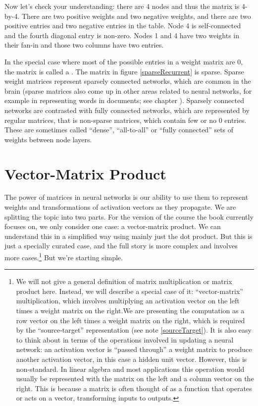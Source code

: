 \noindent Now let's check your understanding: there are 4 nodes and thus the matrix is 4-by-4. There are two positive weights and two negative weights, and there are two positive entries and two negative entries in the table. Node 4 is self-connected and the fourth diagonal entry is non-zero. Nodes 1 and 4 have two weights in their fan-in and those two columns have two entries.

In the special case where most of the possible entries in a weight matrix are 0, the matrix is called a . The matrix in figure \ref{sparseRecurrent} is sparse.  Sparse weight matrices represent sparsely connected networks, which are common in the brain (sparse matrices also come up in other areas related to neural networks, for example in representing words in documents; see chapter ).  Sparsely connected networks are contrasted with fully connected networks, which are represented by regular matrices, that is non-sparse matrices, which contain few or no 0 entries.  These are sometimes called ``dense'',  ``all-to-all'' or ``fully connected'' sets of weights between node layers.


\section{Vector-Matrix Product}

The power of matrices in neural networks is our ability to use them to represent weights and transformations of activation vectors as they propagate. We are splitting the topic into two parts. For the version of the course the book currently focuses on, we only consider one case: a vector-matrix product. We can understand this in a simplified way using mainly just the dot product. But this is just a specially curated case, and the full story is more complex and involves more cases.\footnote{\label{leftRightConvention}  We will not give a general definition of matrix multiplication or matrix product here. Instead, we will describe a special case of it: ``vector-matrix'' multiplication, which involves multiplying an activation vector on the left times a weight matrix on the right.We are presenting the computation as a row vector on the left times a weight matrix on the right, which is required by the ``source-target'' representation (see note \ref{sourceTarget}). It is also easy to think about in terms of the operations involved in updating a neural network: an activation vector is ``passed through'' a weight matrix to produce another activation vector, in this case a hidden unit vector. However, this is non-standard. In linear algebra and most applications this operation would usually be represented with the matrix on the left and a column vector on the right. This is because a matrix is often thought of as a function that operates or acts on a vector, transforming inputs to outputs.}  But we're starting simple.


